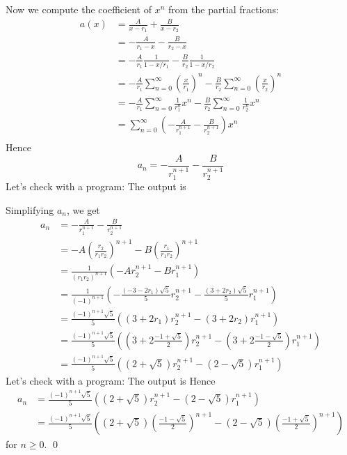 Now we compute the coefficient of $x^n$ from the
partial fractions:
\begin{align*}
a(x)
&= \frac{A}{x - r_1} + \frac{B}{x - r_2} \\
&= -\frac{A}{r_1 - x} - \frac{B}{r_2 - x} \\
&= -\frac{A}{r_1} \frac{1}{1 - x/r_1} - \frac{B}{r_2} \frac{1}{1 - x/r_2} \\
&= -\frac{A}{r_1}\sum_{n=0}^\infty \left( \frac{x}{r_1} \right)^n
   - \frac{B}{r_2}\sum_{n=0}^\infty \left( \frac{x}{r_2} \right)^n\\
&= -\frac{A}{r_1}\sum_{n=0}^\infty  \frac{1}{r_1^n} x^n
   - \frac{B}{r_2}\sum_{n=0}^\infty \frac{1}{r_2^n} x^n\\
&= \sum_{n=0}^\infty
   \left( -\frac{A}{r_1^{n+1}}
   - \frac{B}{r_2^{n+1}}
   \right) x^n\\   
\end{align*}
Hence
\[
a_n = -\frac{A}{r_1^{n+1}} - \frac{B}{r_2^{n+1}}
\]
Let's check with a program:
The output is

Simplifying $a_n$, we get
\begin{align*}
a_n
&= -\frac{A}{r_1^{n+1}} - \frac{B}{r_2^{n+1}}
\\
&= -A\left(\frac{r_2}{r_1r_2}\right)^{n+1} - B\left(\frac{r_1}{r_1r_2} \right)^{n+1}
\\
&=
\frac{1}{(r_1r_2)^{n+1}}
\left(
-A r_2^{n+1}
-B r_1^{n+1}
\right)
\\
&=
\frac{1}{(-1)^{n+1}}
\left(
-\frac{(-3 - 2r_1)\sqrt{5}}{5} r_2^{n+1} 
-\frac{(3 + 2r_2)\sqrt{5}}{5} r_1^{n+1}
\right)
\\
&=
\frac{(-1)^{n+1}\sqrt{5}}{5}
\left(
(3 + 2r_1) r_2^{n+1} 
-(3 + 2r_2) r_1^{n+1}
\right)
\\
&=
\frac{(-1)^{n+1}\sqrt{5}}{5}
\left(
\left( 3 + 2 \frac{-1 + \sqrt{5}}{2} \right) r_2^{n+1} 
-
\left( 3 + 2 \frac{-1 - \sqrt{5}}{2} \right) r_1^{n+1}
\right)
\\
&=
\frac{(-1)^{n+1}\sqrt{5}}{5}
\left(
\left( 2 + \sqrt{5} \right) r_2^{n+1} 
-
\left( 2 - \sqrt{5} \right) r_1^{n+1}
\right)
\end{align*}
Let's check with a program:
The output is
Hence
\begin{align*}
a_n
&=
\frac{(-1)^{n+1}\sqrt{5}}{5}
\left(
\left( 2 + \sqrt{5} \right) r_2^{n+1} 
-
\left( 2 - \sqrt{5} \right) r_1^{n+1}
\right)
\\
&=
\frac{(-1)^{n+1}\sqrt{5}}{5}
\left(
\left( 2 + \sqrt{5} \right) \left( \frac{-1 - \sqrt{5}}{2} \right)^{n+1} 
-
\left( 2 - \sqrt{5} \right) \left( \frac{-1 + \sqrt{5}}{2} \right)^{n+1}
\right)
\end{align*}
for $n \geq 0$.
\qed
